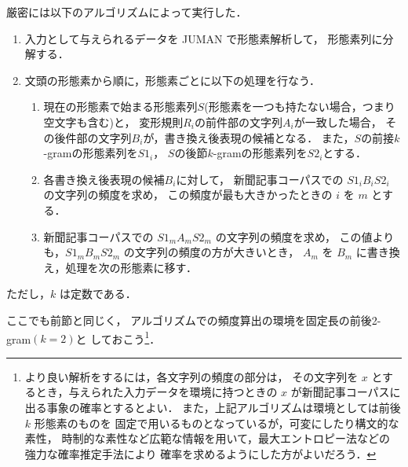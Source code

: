 厳密には以下のアルゴリズムによって実行した．
\begin{enumerate}
\item 
  入力として与えられるデータを JUMAN で形態素解析して，
  形態素列に分解する．

\item 
  \label{enum:proc1_2}
  文頭の形態素から順に，形態素ごとに以下の処理を行なう．

  \begin{enumerate}
  \item 
      現在の形態素で始まる形態素列$S$(形態素を一つも持たない場合，つまり
      空文字も含む)と，
    変形規則$R_i$の前件部の文字列$A_i$が一致した場合，
    その後件部の文字列$B_i$が，書き換え後表現の候補となる．
    また，$S$の前接$k$-gramの形態素列を$S1_i$，
    $S$の後節$k$-gramの形態素列を$S2_i$とする．

  \item 
    各書き換え後表現の候補$B_i$に対して，
    新聞記事コーパスでの
    $S1_i$$B_i$$S2_i$ の文字列の頻度を求め，
    この頻度が最も大きかったときの $i$ を $m$ とする．
  
  \item 
    新聞記事コーパスでの
    $S1_m$$A_m$$S2_m$ の文字列の頻度を求め，
    この値よりも，$S1_m$$B_m$$S2_m$ の文字列の頻度の方が大きいとき，
    $A_m$ を $B_m$ に書き換え，処理を次の形態素に移す．
  \end{enumerate}
\end{enumerate}
ただし，$k$ は定数である．

ここでも前節と同じく，
アルゴリズムでの頻度算出の環境を固定長の前後2-gram$(k=2)$と
しておこう\footnote{\label{fn:kairyou} より良い解析をするには，各文字列の頻度の部分は，
その文字列を $x$ とするとき，与えられた入力データを環境に持つときの
$x$ が新聞記事コーパスに出る事象の確率とするとよい．
また，上記アルゴリズムは環境としては前後 $k$ 形態素のものを
固定で用いるものとなっているが，可変にしたり構文的な素性，
時制的な素性など広範な情報を用いて，最大エントロピー法などの
強力な確率推定手法により
確率を求めるようにした方がよいだろう．}．

